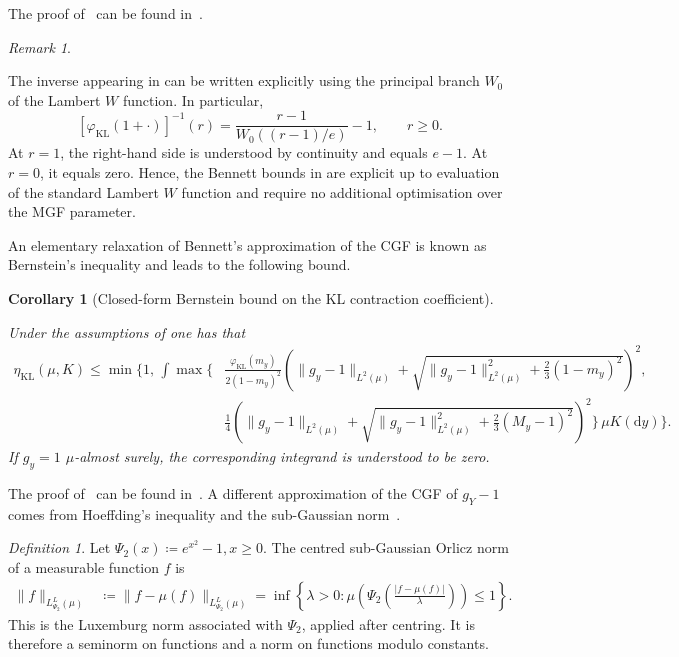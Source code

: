 \documentclass[11pt]{article}
\theoremstyle{plain}
\newtheorem{corollary}{Corollary}[section]
\theoremstyle{remark}
\newtheorem{definition}[theorem]{Definition}
\newtheorem{remark}{Remark}
\begin{document}
The proof of~ can be found in~.
\begin{remark}
\label{rem:inverseKLGenerator}

The inverse appearing in
 can be written explicitly using the
principal branch $W_0$ of the Lambert $W$ function. In particular,
\begin{equation}
    \left[
        \varphi_{\mathrm{KL}}(1+\cdot)
    \right]^{-1}(r)
    =
    \frac{
        r-1
    }{
        W_0\left((r-1)/e\right)
    }
    -1,
    \qquad r\geq0.
    \label{eq:inverseKLGeneratorLambertW}
\end{equation}
At $r=1$, the right-hand side is understood by continuity and equals
$e-1$. At $r=0$, it equals zero. Hence, the Bennett bounds in
 are explicit up to evaluation of the
standard Lambert $W$ function and require no additional optimisation
over the MGF parameter.
\end{remark}
An elementary relaxation of Bennett's approximation of the CGF is known as Bernstein's inequality and leads to the following bound.
\begin{corollary}[Closed-form Bernstein bound on the KL contraction coefficient]
\label{cor:klBernsteinClosedFormSDPI}

Under the assumptions of
 one has that
\begin{align}
\eta_{\mathrm{KL}}(\mu,K)
\leq
\min\Bigg\{
1,\,
\int
\max\Bigg\{
&
\frac{
    \varphi_{\mathrm{KL}}(m_y)
}{
    2(1-m_y)^2
}
\left(
    \lVert g_y-1\rVert_{L^2(\mu)}
    +
    \sqrt{
        \lVert g_y-1\rVert_{L^2(\mu)}^2
        +
        \frac{2}{3}(1-m_y)^2
    }
\right)^2,
\nonumber\\
&
\frac{1}{4}
\left(
    \lVert g_y-1\rVert_{L^2(\mu)}
    +
    \sqrt{
        \lVert g_y-1\rVert_{L^2(\mu)}^2
        +
        \frac{2}{3}(M_y-1)^2
    }
\right)^2
\Bigg\}
\,\mu K(\mathrm dy)
\Bigg\}.
\label{eq:klBernsteinClosedFormSDPI}
\end{align}
If $g_y=1$ $\mu$-almost surely, the corresponding integrand is
understood to be zero.
\end{corollary}

The proof of~ can be found in~.
A different approximation of the CGF of $g_Y-1$ comes from Hoeffding's inequality and the sub-Gaussian norm~\cite{vershynin_2018}. 
\begin{definition}
Let 
$ \Psi_2(x)\coloneqq e^{x^2}-1, x\geq0.$
The centred sub-Gaussian Orlicz norm of a measurable function $f$ is
\begin{align}
\lVert f\rVert_{L^L_{\Psi_2}(\mu)}
&\coloneqq
\lVert f-\mu(f)\rVert_{L^L_{\Psi_2}(\mu)} =
\inf\left\{
\lambda>0:
\mu\left(
\Psi_2\left(
\frac{|f-\mu(f)|}{\lambda}
\right)
\right)
\leq1
\right\}.
\label{eq:subGaussianOrliczNorm}
\end{align}
This is the Luxemburg norm associated with $\Psi_2$, applied after
centring. It is therefore a seminorm on functions and a norm on
functions modulo constants.
\end{definition}
\end{document}

